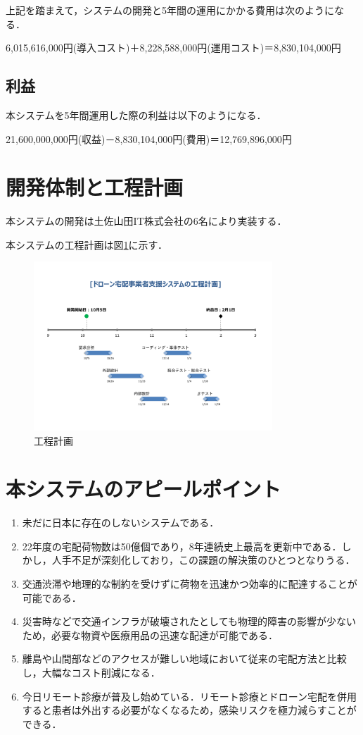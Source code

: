 \documentclass[a4paper, titlepage]{jsarticle}
\begin{document}
上記を踏まえて，システムの開発と5年間の運用にかかる費用は次のようになる．
\begin{center}
  6,015,616,000円(導入コスト)＋8,228,588,000円(運用コスト)＝8,830,104,000円
\end{center}

\subsection{利益}
本システムを5年間運用した際の利益は以下のようになる．
\begin{center}
  21,600,000,000円(収益)－8,830,104,000円(費用)＝12,769,896,000円
\end{center}

\section{開発体制と工程計画}
本システムの開発は土佐山田IT株式会社の6名により実装する．

本システムの工程計画は図\ref{fig:schedule}に示す．
\begin{figure}[htbp]
  \label{fig:schedule}
  \centering
  \includegraphics[width=0.8\textwidth]{schedule.pdf}
  \caption{工程計画}
\end{figure}

\section{本システムのアピールポイント}
\begin{enumerate}
  \item 未だに日本に存在のしないシステムである．
  \item 22年度の宅配荷物数は50億個であり，8年連続史上最高を更新中である．しかし，人手不足が深刻化しており，この課題の解決策のひとつとなりうる．
  \item 交通渋滞や地理的な制約を受けずに荷物を迅速かつ効率的に配達することが可能である．
  \item 災害時などで交通インフラが破壊されたとしても物理的障害の影響が少ないため，必要な物資や医療用品の迅速な配達が可能である．
  \item 離島や山間部などのアクセスが難しい地域において従来の宅配方法と比較し，大幅なコスト削減になる．
  \item 今日リモート診療が普及し始めている．リモート診療とドローン宅配を併用すると患者は外出する必要がなくなるため，感染リスクを極力減らすことができる．
\end{enumerate}
\end{document}
